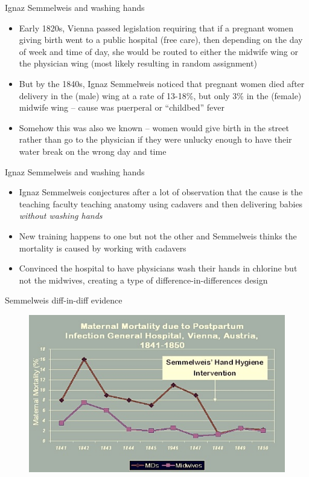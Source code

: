 \documentclass{beamer}
\begin{document}
\begin{frame}{Ignaz Semmelweis and washing hands}

\begin{itemize}
\item Early 1820s, Vienna passed legislation requiring that if a pregnant women giving birth went to a public hospital (free care), then depending on the day of week and time of day, she would be routed to either the midwife wing or the physician wing (most likely resulting in random assignment)
\item But by the 1840s, Ignaz Semmelweis noticed that pregnant women died after delivery in the (male) wing at a rate of 13-18\%, but only 3\% in the (female) midwife wing -- cause was puerperal or “childbed” fever
\item Somehow this was also we known -- women would give birth in the street rather than go to the physician if they were unlucky enough to have their water break on the wrong day and time
\end{itemize}

\end{frame}

\begin{frame}{Ignaz Semmelweis and washing hands}

\begin{itemize}
\item Ignaz Semmelweis conjectures after a lot of observation that the cause is the teaching faculty teaching anatomy using cadavers and then delivering babies \emph{without washing hands}
\item New training happens to one but not the other and Semmelweis thinks the mortality is caused by working with cadavers
\item Convinced the hospital to have physicians wash their hands in chlorine but not the midwives, creating a type of difference-in-differences design 
\end{itemize}

\end{frame}

\begin{frame}{Semmelweis diff-in-diff evidence}

	\begin{figure}
	\includegraphics[scale=0.5]{./lecture_includes/semmelweis_graph.jpg}
	\end{figure}


\end{frame}
\end{document}
